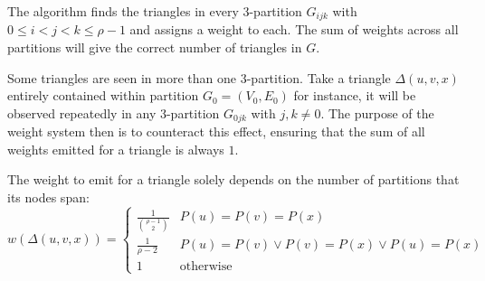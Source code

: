 \documentclass[paper=a4, fontsize=11pt]{scrartcl}
\numberwithin{equation}{section}
\numberwithin{figure}{section}
\numberwithin{table}{section}
\begin{document}
The algorithm finds the triangles in every 3-partition $G_{ijk}$ with $0 \le i <
j < k \le \rho - 1$ and assigns a weight to each. The sum of weights across all
partitions will give the correct number of triangles in $G$.

Some triangles are seen in more than one 3-partition. Take a triangle $\Delta(u,
v, x)$ entirely contained within partition $G_0=(V_0, E_0)$ for instance, it
will be observed repeatedly in any 3-partition $G_{0jk}$ with $j,k\neq 0$. The
purpose of the weight system then is to counteract this effect, ensuring that
the sum of all weights emitted for a triangle is always $1$. 

The weight to emit for a triangle solely depends on the number of partitions
that its nodes span:
\[
    w(\Delta(u,v,x)) = \begin{cases}
        \frac{1}{\binom{\rho-1}{2}} & P(u) = P(v) = P(x)  \\
        \frac{1}{\rho-2} & P(u) = P(v) \vee P(v) = P(x) \vee P(u) = P(x) \\
        1 & \text{otherwise}
    \end{cases}
\]
\end{document}
